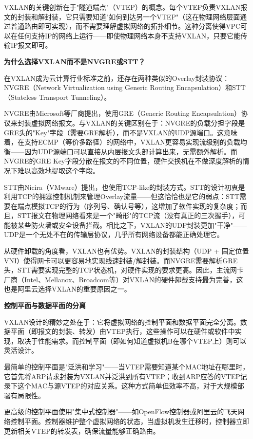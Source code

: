 VXLAN的关键创新在于"隧道端点"（VTEP）的概念。每个VTEP负责VXLAN报文的封装和解封装，它只需要知道"如何到达另一个VTEP"（这在物理网络层面通过普通路由即可实现），而不需要理解虚拟网络的拓扑细节。这种分离使得VPC可以在任何支持IP的网络上运行——即使物理网络本身不支持VXLAN，只要它能传输IP报文即可。

\textbf{为什么选择VXLAN而不是NVGRE或STT？}

在VXLAN成为云计算行业标准之前，还存在两种类似的Overlay封装协议：NVGRE（Network Virtualization using Generic Routing Encapsulation）和STT（Stateless Transport Tunneling）。

NVGRE由Microsoft等厂商提出，使用GRE（Generic Routing Encapsulation）协议来封装虚拟网络报文。与VXLAN的关键区别在于：NVGRE的负载分担字段是GRE头的"Key"字段（需要GRE解析），而不是VXLAN的UDP源端口。这意味着，在支持ECMP（等价多路径）的网络中，VXLAN更容易实现流级别的负载均衡——因为UDP源端口可以直接从内层报文头部计算出来，无需额外解析。而NVGRE的GRE Key字段分散在报文的不同位置，硬件交换机在不做深度解析的情况下难以高效地提取这个字段。

STT由Nicira（VMware）提出，也使用TCP-like的封装方式。STT的设计初衷是利用TCP的拥塞控制机制来管理Overlay流量——但这恰恰也是它的弱点：STT需要在端点模拟TCP的行为（序列号、确认号等），这增加了软件实现的复杂度；而且，STT报文在物理网络看来是一个"畸形"的TCP流（没有真正的三次握手），可能被某些防火墙或安全设备拦截。相比之下，VXLAN的UDP封装更加"干净"——UDP是一个无处不在的传输层协议，几乎所有网络设备都能正确处理它。

从硬件卸载的角度看，VXLAN也有优势。VXLAN的封装结构（UDP + 固定位置VNI）使得网卡可以更容易地实现线速封装/解封装。而NVGRE需要解析GRE头，STT需要实现完整的TCP状态机，对硬件实现的要求更高。因此，主流网卡厂商（Intel、Mellanox、Broadcom等）对VXLAN的硬件卸载支持最为完善，这也是阿里云选择VXLAN的重要原因之一。

\textbf{控制平面与数据平面的分离}

VXLAN设计的精妙之处在于：它将虚拟网络的控制平面和数据平面完全分离。数据平面（即报文的封装、转发）由VTEP执行，这些操作可以在硬件或软件中实现，取决于性能需求。而控制平面（即如何知道虚拟机B在哪个VTEP上）则可以灵活设计。

最简单的控制平面是"泛洪和学习"——当VTEP需要知道某个MAC地址在哪里时，它首先将ARP请求封装为VXLAN并泛洪到所有VTEP；收到ARP应答的VTEP记录下这个MAC与源VTEP的对应关系。这种方式简单但效率不高，对于大规模部署有局限性。

更高级的控制平面使用"集中式控制器"——如OpenFlow控制器或阿里云的飞天网络控制平面。控制器维护整个虚拟网络的状态，当虚拟机发生迁移时，控制器立即更新相关VTEP的转发表，确保流量能够正确路由。

